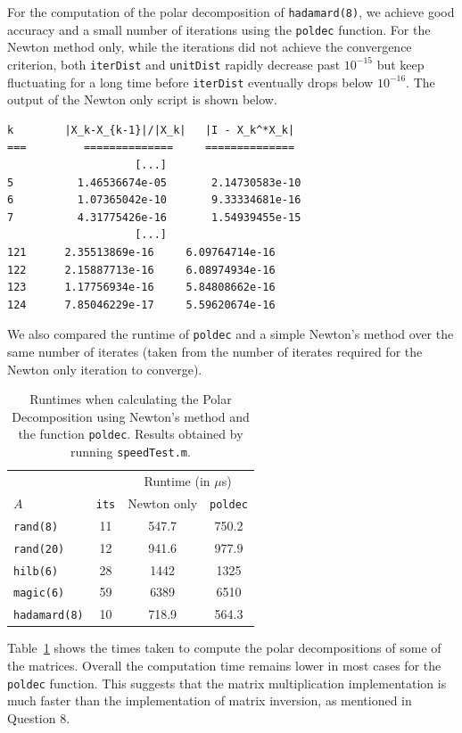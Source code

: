 \documentclass[10pt, A4paper]{article}
\begin{document}
For the computation of the polar decomposition of \texttt{hadamard(8)}, 
we achieve good accuracy and a small number of iterations using the 
\texttt{poldec} function. For the Newton method only, while the 
iterations did not achieve the convergence criterion, both 
\texttt{iterDist} and \texttt{unitDist} rapidly decrease past 
$10^{-15}$ but keep fluctuating for a long time before 
\texttt{iterDist} eventually drops below $10^{-16}$. The output of the 
Newton only script is shown below.
\begin{verbatim}
k   	 |X_k-X_{k-1}|/|X_k|   |I - X_k^*X_k|
=== 	    ==============     ==============
                    [...]
5	       1.46536674e-05	    2.14730583e-10
6	       1.07365042e-10	    9.33334681e-16
7	       4.31775426e-16	    1.54939455e-15
                    [...]
121	     2.35513869e-16	    6.09764714e-16
122	     2.15887713e-16	    6.08974934e-16
123      1.17756934e-16	    5.84808662e-16
124      7.85046229e-17	    5.59620674e-16
\end{verbatim}

We also compared the runtime of \texttt{poldec} and a simple Newton's 
method over the same number of iterates (taken from the number of 
iterates required for the Newton only iteration to converge).
\begin{table}[t]
	\centering
	\begin{tabular}{ l c c c }
		\toprule
		& &\multicolumn{2}{c}{Runtime (in $\mu$s)} \\
		\cmidrule(lr){3-4}
		$A$ & \texttt{its} & Newton only & \texttt{poldec} \\
		\midrule
		\texttt{rand(8)}     & 11 & 547.7 & 750.2  \\
		\texttt{rand(20)}    & 12 & 941.6 & 977.9  \\
		\texttt{hilb(6)}     & 28 & 1442  & 1325   \\
		\texttt{magic(6)}    & 59 & 6389  & 6510   \\
		\texttt{hadamard(8)} & 10 & 718.9 & 564.3  \\
		\bottomrule
	\end{tabular}
	\caption{
	Runtimes when calculating the Polar Decomposition using 
	Newton's method and the function \texttt{poldec}. Results obtained 
	by running \texttt{speedTest.m}.
	\label{tab:runtimes}}
\end{table}
Table~\ref{tab:runtimes} shows the times taken to compute the polar 
decompositions of some of the matrices. Overall the computation time 
remains lower in most cases for the \texttt{poldec} function.
This suggests that the matrix multiplication implementation is 
much faster than the implementation of matrix inversion, as mentioned 
in Question 8.
\end{document}
